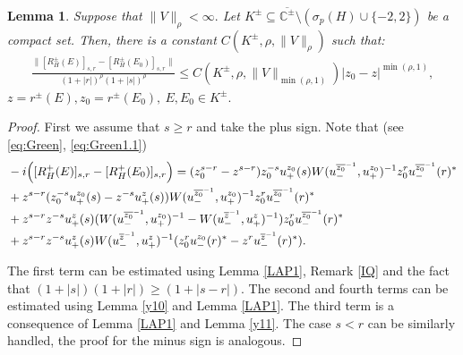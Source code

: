 \documentclass[12pt,oneside,onecolumn,open]{article}
\newtheorem{lema}[teo]{Lemma}
\begin{document}
\begin{lema} \label{y12} Suppose that  $\|  V \|
  _{\rho} < \infty .$ 
   Let $K^{\pm}\subseteq  \overline{\mathbb{C}^{\pm}}\setminus ( \sigma_p (H)\cup \{-2,2 \} )$ be a compact set. 
   Then, there is a constant $ C(K^{\pm}, \rho, \|  V\|_{\rho})$ such that:
    \begin{align}\label{i6}
    \frac{\|[R^{\pm}_{H}(E)]_{s,r}-[R^{\pm}_{H}(E_0)]_{s,r}\|}{(1+|r|)^{\rho }(1+|s|)^{\rho }}\leq C(K^{\pm}, \rho, \|  V \|_{\min(\rho, 1)})|z_0 -z|^{\min(\rho, 1) }  ,
\end{align}   $z= r^\pm(E),  z_0 = r^{\pm}(E_0),   \: E, E_0 \in K^{\pm}.$
\end{lema}
\begin{proof} First we assume that  $ s\geq r $ and take the plus sign. Note that (see  \eqref{eq:Green},  \eqref{eq:Green1.1})
    \begin{align}
     &  -i \Big (  [R^+_{H}(E)]_{s,r}-[R^+_{H}(E_0)]_{s,r}   \Big ) =\notag
     (z_0 ^{s-r} -z^{s-r})z_0 ^{-s}u_{+}^{z_0}(s)W(u_-^{\overline{z_0}^{-1}} ,u_{+}^{z_0})^{-1}z_0 ^{r}u_-^{\overline{z_0}^{-1}}(r)^{*}\notag\\
     &+z^{s-r}(z_0^{-s}u_{+}^{z_0}(s)-z^{-s}u_+^{z}(s))W(u_-^{\overline{z_0}^{-1}} ,u_{+}^{z_0})^{-1}z_0 ^{r}u_-^{\overline{z_0}^{-1}}(r)^{*}\notag\\
     &+z^{s-r}z^{-s}u_+^{z}(s)(W(u_-^{\overline{z_0}^{-1}} ,u_{+}^{z_0})^{-1}-W(u_-^{\overline{z}^{-1}},u_+^{z})^{-1})z_0^{r}u_-^{\overline{z_0}^{-1}}(r)^{*}\notag\\
     &+z^{s-r}z^{-s}u_+^{z}(s)W(u_-^{\overline{z}^{-1}},u_+^{z})^{-1}(z_0^{r}u_-^{z_0}(r)^{*}-z^{r}u_-^{\overline{z}^{-1}}(r)^{*}) .
 \end{align}

The first term can be estimated using Lemma \ref{LAP1}, Remark \ref{IQ} and the fact that $(1+|s|)(1+|r|)\geq (1+|s-r|)$. The second and fourth terms can be estimated using Lemma \ref{y10} and Lemma \ref{LAP1}. The third term is a consequence of Lemma \ref{LAP1} and Lemma \ref{y11}. %
The case $ s <  r $ can be similarly handled, the proof for the minus sign is analogous. 
\end{proof}
\end{document}
